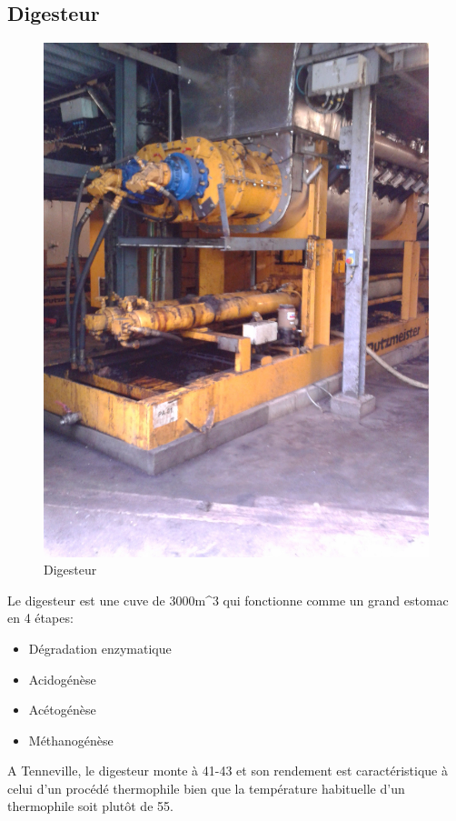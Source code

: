 \documentclass{article}
\begin{document}
\subsection{Digesteur}
\begin{figure}
  \centering
  \includegraphics[scale=0.07]{IMG_20141105_112953.jpg}
  \caption{Digesteur}
  \label{fig:digesteur}
\end{figure}
Le digesteur est une cuve de \unit{3000}{m^3} qui fonctionne comme un grand estomac en 4 étapes: 
\begin{itemize}
\item Dégradation enzymatique
\item Acidogénèse
\item Acétogénèse
\item Méthanogénèse
\end{itemize}
A Tenneville, le digesteur monte à \unit{41}{\degree}-\unit{43}{\degree}  et son rendement est caractéristique à celui d'un procédé thermophile bien que la température habituelle d'un thermophile soit plutôt de \unit{55}{\degree}. 
\end{document}
